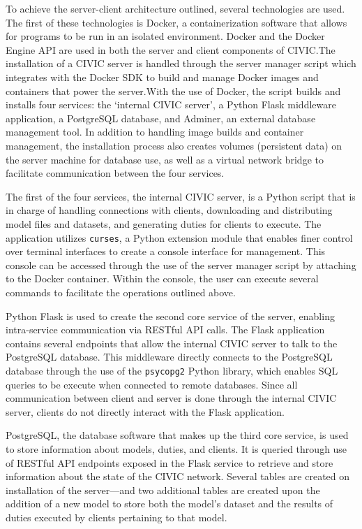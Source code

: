 \documentclass[11pt]{article}
\begin{document}
To achieve the server-client architecture outlined, several technologies are used. The first of these technologies is Docker, a containerization software that allows for programs to be run in an isolated environment. Docker and the Docker Engine API are used in both the server and client components of CIVIC.\@ The installation of a CIVIC server is handled through the server manager script which integrates with the Docker SDK to build and manage Docker images and containers that power the server.\@ With the use of Docker, the script builds and installs four services: the `internal CIVIC server', a Python Flask middleware application, a PostgreSQL database, and Adminer, an external database management tool. In addition to handling image builds and container management, the installation process also creates volumes (persistent data) on the server machine for database use, as well as a virtual network bridge to facilitate communication between the four services. 

The first of the four services, the internal CIVIC server, is a Python script that is in charge of handling connections with clients, downloading and distributing model files and datasets, and generating duties for clients to execute. The application utilizes \verb|curses|, a Python extension module that enables finer control over terminal interfaces to create a console interface for management. This console can be accessed through the use of the server manager script by attaching to the Docker container. Within the console, the user can execute several commands to facilitate the operations outlined above. 

Python Flask is used to create the second core service of the server, enabling intra-service communication via RESTful API calls. The Flask application contains several endpoints that allow the internal CIVIC server to talk to the PostgreSQL database. This middleware directly connects to the PostgreSQL database through the use of the \verb|psycopg2| Python library, which enables SQL queries to be execute when connected to remote databases. Since all communication between client and server is done through the internal CIVIC server, clients do not directly interact with the Flask application. 

PostgreSQL, the database software that makes up the third core service, is used to store information about models, duties, and clients. It is queried through use of RESTful API endpoints exposed in the Flask service to retrieve and store information about the state of the CIVIC network. Several tables are created on installation of the server---and two additional tables are created upon the addition of a new model to store both the model's dataset and the results of duties executed by clients pertaining to that model. 
\end{document}

